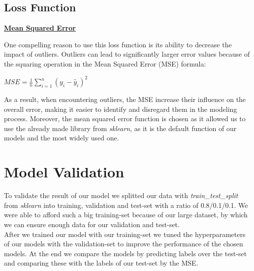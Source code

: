 \documentclass[12pt]{article}
\begin{document}
\subsection{Loss Function}


\underline{\textbf{Mean Squared Error}}

One compelling reason to use this loss function is its ability to decrease the impact of outliers. Outliers can lead to significantly larger error values because of the squaring operation in the Mean Squared Error (MSE) formula:

\vspace{0.2em}

\begin{center}
$MSE = \frac{1}{n} \sum_{i=1}^{n}(y_i - \hat{y}_i)^2$
\end{center}
\vspace{0.2em}


As a result, when encountering outliers, the MSE increase their influence on the overall error, making it easier to identify and disregard them in the modeling process. Moreover, the mean squared error function is chosen as it allowed us to use the already made library from \textit{sklearn}, as it is the default function of our models and the most widely used one.\cite{chai_root_2014}


\section{Model Validation}
To validate the result of our model we splitted our data with \textit{train\_test\_split} from \textit{sklearn} into training, validation and test-set with a ratio of 0.8/0.1/0.1. We were able to afford such a big training-set because of our large dataset, by which we can ensure enough data for our validation and test-set.\\
After we trained our model with our training-set we tuned the hyperparameters of our models with the validation-set to improve the performance of the chosen models. At the end we compare the models by predicting labels over the test-set and comparing these with the labels of our test-set by the MSE.
\end{document}
